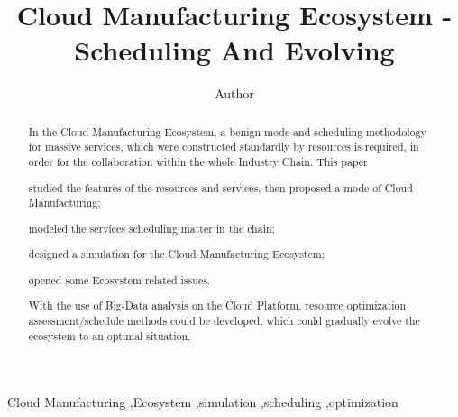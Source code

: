 
\title{Cloud Manufacturing Ecosystem - Scheduling And Evolving}

\author[label1]{Author}
\address[label1]{ZJU}
\begin{abstract}
In the Cloud Manufacturing Ecosystem, a benign mode and scheduling methodology for massive services, which were constructed standardly by resources is required, in order for the collaboration within the whole Industry Chain.
This paper 
\begin{inparaenum}[1)]
\item studied the features of the resources and services, then proposed a mode of Cloud Manufacturing;
\item modeled the services scheduling matter in the chain;
\item designed a simulation for the Cloud Manufacturing Ecosystem;
\item opened some Ecosystem related issues. 
\end{inparaenum}
With the use of Big-Data analysis on the Cloud Platform, resource optimization assessment/schedule methods could be developed, which could
gradually evolve the ecosystem to an optimal situation.

\end{abstract}

\begin{keyword}
Cloud Manufacturing \sep Ecosystem \sep simulation \sep scheduling \sep optimization
\end{keyword}